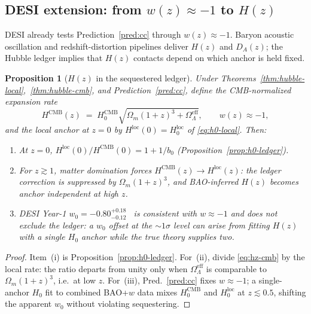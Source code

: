 \documentclass[aps,prd,onecolumn,amsmath,amssymb,nofootinbib,11pt]{revtex4-2}
\numberwithin{equation}{section}
\theoremstyle{plain}
\newtheorem{proposition}[theorem]{Proposition}
\theoremstyle{definition}
\theoremstyle{remark}
\begin{document}
\subsection{DESI extension: from $w(z)\approx -1$ to $H(z)$}
\label{sec:cosmology:desi-hz}

DESI already tests Prediction~\ref{pred:cc} through $w(z)\approx -1$.
Baryon acoustic oscillation and redshift-distortion pipelines deliver
$H(z)$ and $D_A(z)$; the Hubble ledger implies that $H(z)$ contacts depend on
which anchor is held fixed.

\begin{proposition}[$H(z)$ in the sequestered ledger]
\label{prop:hz-ledger}
Under Theorems~\ref{thm:hubble-local},~\ref{thm:hubble-cmb}, and
Prediction~\ref{pred:cc}, define the CMB-normalized expansion rate
\begin{equation}\label{eq:hz-cmb}
  H^{\mathrm{CMB}}(z)
  \;=\;
  H_0^{\mathrm{CMB}}
  \sqrt{
    \Omega_m(1+z)^3+\Omega_\Lambda^{\mathrm{eff}}
  },
  \qquad
  w(z)\approx -1,
\end{equation}
and the local anchor at $z=0$ by $H^{\mathrm{loc}}(0)=H_0^{\mathrm{loc}}$ of
\eqref{eq:h0-local}. Then:
\begin{enumerate}[label=(\roman*),leftmargin=*]
  \item At $z=0$, $H^{\mathrm{loc}}(0)/H^{\mathrm{CMB}}(0)=1+1/b_0$
    (Proposition~\ref{prop:h0-ledger}).
  \item For $z\gtrsim 1$, matter domination forces
    $H^{\mathrm{CMB}}(z)\to H^{\mathrm{loc}}(z)$: the ledger correction is
    suppressed by $\Omega_m(1+z)^3$, and BAO-inferred $H(z)$ becomes anchor
    independent at high $z$.
  \item DESI Year-1 $w_0=-0.80^{+0.18}_{-0.12}$~\cite{DESI2024} is
    consistent with $w\approx -1$ and does \emph{not} exclude the ledger:
    a $w_0$ offset at the $\sim 1\sigma$ level can arise from fitting
    $H(z)$ with a single $H_0$ anchor while the true theory supplies two.
\end{enumerate}
\end{proposition}

\begin{proof}
Item~(i) is Proposition~\ref{prop:h0-ledger}. For~(ii), divide
\eqref{eq:hz-cmb} by the local rate: the ratio departs from unity only when
$\Omega_\Lambda^{\mathrm{eff}}$ is comparable to $\Omega_m(1+z)^3$, i.e.\ at
low $z$. For~(iii), Pred.~\ref{pred:cc} fixes $w\approx -1$; a single-anchor
$H_0$ fit to combined BAO+$w$ data mixes $H_0^{\mathrm{CMB}}$ and
$H_0^{\mathrm{loc}}$ at $z\lesssim 0.5$, shifting the apparent $w_0$ without
violating sequestering.
\end{proof}
\end{document}
